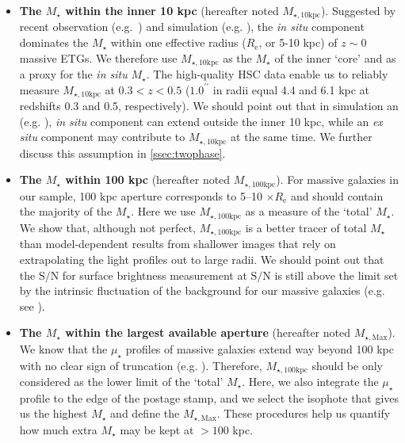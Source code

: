 \documentclass[fleqn,usenatbib]{mnras}
\def\arcsec{{\prime\prime}}
\def\mstar{{$M_{\star}$}}
\def\minn{{$M_{\star,10\mathrm{kpc}}$}}
\def\mtot{{$M_{\star,100\mathrm{kpc}}$}}
\def\mmax{{$M_{\star,\mathrm{Max}}$}}
\def\s2n{{$\mathrm{S}/\mathrm{N}$}}
\def\mden{{$\mu_{\star}$}}
\begin{document}
    \begin{itemize} 
       
        \item \textbf{The \mstar{} within the inner 10 kpc} 
            (hereafter noted \minn{}). 
            Suggested by recent observation (e.g.~\citealt{vanDokkum2010}) and 
            simulation (e.g. \citealt{RodriguezGomez2016}), the \textit{in situ} 
            component dominates the \mstar{} within one effective radius 
            ($R_{\mathrm{e}}$, or 5-10 kpc) of $z{\sim}0$ massive ETGs.
            We therefore use \minn{} as the \mstar{} of the inner `core' and as 
            a proxy for the \textit{in situ} \mstar{}. 
            The high-quality HSC data enable us to reliably measure \minn{} at 
            $0.3 < z < 0.5$ ($1.0^{\arcsec}$ in radii equal 4.4 and 6.1 kpc 
            at redshifts 0.3 and 0.5, respectively).
            We should point out that in simulation an
            (e.g. \citealt{RodriguezGomez2016}), \textit{in situ} component can 
            extend outside the inner 10 kpc, while an \textit{ex situ} component may 
            contribute to \minn{} at the same time.  
            We further discuss this assumption in \ref{ssec:twophase}.
            
        \item \textbf{The \mstar{} within 100 kpc} 
            (hereafter noted \mtot{}). 
            For massive galaxies in our sample, 100 kpc aperture corresponds to 5--10 
            $\times R_{\mathrm{e}}$ and should contain the majority of the \mstar{}. 
            Here we use \mtot{} as a measure of the `total' \mstar{}. 
            We show that, although not perfect, \mtot{} is a better tracer 
            of total \mstar{} than model-dependent results from shallower images 
            that rely on extrapolating the light profiles out to large radii. 
            We should point out that the \s2n{} for surface brightness measurement 
            at \s2n{} is still above the limit set by the intrinsic fluctuation 
            of the background for our massive galaxies 
            (e.g. see \citealt{Pohlen2006}). 
            
        \item \textbf{The \mstar{} within the largest available aperture} 
            (hereafter noted \mmax{}).
            We know that the \mden{} profiles of massive galaxies extend way beyond 
            100 kpc with no clear sign of truncation
            (e.g. \citealt{Gonzalez2005, Tal2011, DSouza2014}).
            Therefore, \mtot{} should be only considered as the lower limit of the
            `total' \mstar{}. 
            Here, we also integrate the \mden{} profile to the edge of the 
            postage stamp, and we select the isophote that gives us the highest  
            \mstar{} and define the \mmax{}. 
            These procedures help us quantify how much extra \mstar{} may be kept 
            at $>100$ kpc.
            
    \end{itemize}
       
\end{document}
